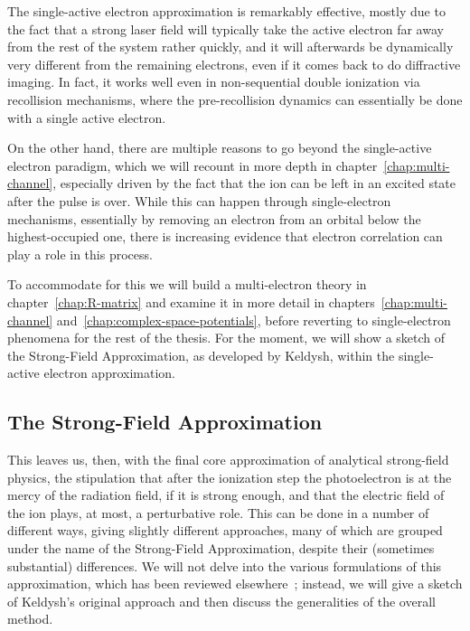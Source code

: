 The single-active electron approximation is remarkably effective, mostly due to the fact that a strong laser field will typically take the active electron far away from the rest of the system rather quickly, and it will afterwards be dynamically very different from the remaining electrons, even if it comes back to do diffractive imaging. In fact, it works well even in non-sequential double ionization via recollision mechanisms, where the pre-recollision dynamics can essentially be done with a single active electron.

On the other hand, there are multiple reasons to go beyond the single-active electron paradigm, which we will recount in more depth in chapter~\ref{chap:multi-channel}, especially driven by the fact that the ion can be left in an excited state after the pulse is over. While this can happen through single-electron mechanisms, essentially by removing an electron from an orbital below the highest-occupied one, there is increasing evidence that electron correlation can play a role in this process. 

To accommodate for this we will build a multi-electron theory in chapter~\ref{chap:R-matrix} and examine it in more detail in chapters~\ref{chap:multi-channel} and~\ref{chap:complex-space-potentials}, before reverting to single-electron phenomena for the rest of the thesis. For the moment, we will show a sketch of the Strong-Field Approximation, as developed by Keldysh, within the single-active electron approximation.



\subsection{The Strong-Field Approximation}


This leaves us, then, with the final core approximation of analytical strong-field physics, the stipulation that after the ionization step the photoelectron is at the mercy of the radiation field, if it is strong enough, and that the electric field of the ion plays, at most, a perturbative role. This can be done in a number of different ways, giving slightly different approaches, many of which are grouped under the name of the Strong-Field Approximation, despite their (sometimes substantial) differences. We will not delve into the various formulations of this approximation, which has been reviewed elsewhere~\cite{popruzhenko_Keldysh_theory, galstyan_sfa-reformulation_2016}; instead, we will give a sketch of Keldysh's original approach and then discuss the generalities of the overall method.


